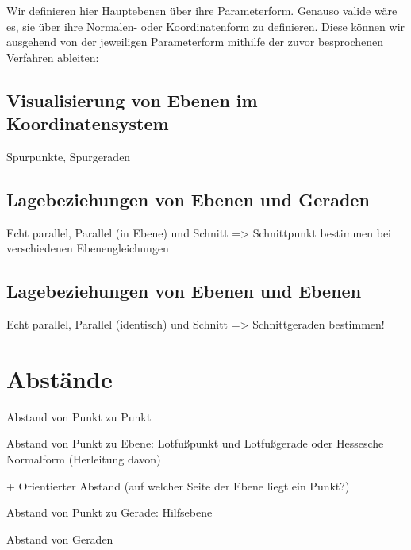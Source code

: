 Wir definieren hier Hauptebenen über ihre Parameterform. Genauso valide wäre es, sie über ihre Normalen- oder Koordinatenform zu definieren. Diese können wir ausgehend von der jeweiligen Parameterform mithilfe der zuvor besprochenen Verfahren ableiten: 

\begin{proposition}
    
\end{proposition}

\subsection{Visualisierung von Ebenen im Koordinatensystem}
Spurpunkte, Spurgeraden

\subsection{Lagebeziehungen von Ebenen und Geraden}
Echt parallel, Parallel (in Ebene) und Schnitt => Schnittpunkt bestimmen bei verschiedenen Ebenengleichungen

\subsection{Lagebeziehungen von Ebenen und Ebenen}
Echt parallel, Parallel (identisch) und Schnitt => Schnittgeraden bestimmen!

\section{Abstände}
Abstand von Punkt zu Punkt

Abstand von Punkt zu Ebene: Lotfußpunkt und Lotfußgerade oder Hessesche Normalform (Herleitung davon)

+ Orientierter Abstand (auf welcher Seite der Ebene liegt ein Punkt?)

Abstand von Punkt zu Gerade: Hilfsebene 

Abstand von Geraden

